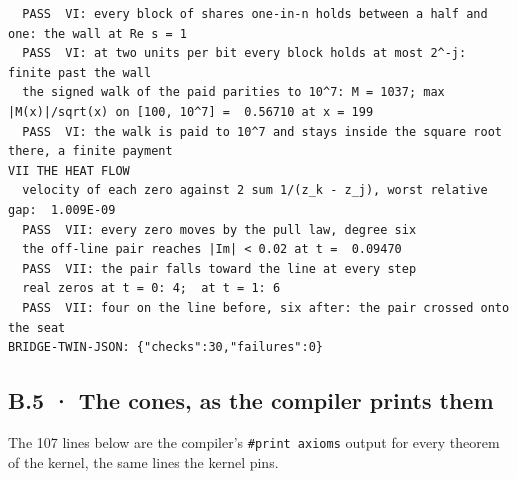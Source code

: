 \documentclass[10pt,twocolumn]{article}
\begin{document}
\begin{Verbatim}
  PASS  VI: every block of shares one-in-n holds between a half and one: the wall at Re s = 1
  PASS  VI: at two units per bit every block holds at most 2^-j: finite past the wall
  the signed walk of the paid parities to 10^7: M = 1037; max |M(x)|/sqrt(x) on [100, 10^7] =  0.56710 at x = 199
  PASS  VI: the walk is paid to 10^7 and stays inside the square root there, a finite payment
VII THE HEAT FLOW
  velocity of each zero against 2 sum 1/(z_k - z_j), worst relative gap:  1.009E-09
  PASS  VII: every zero moves by the pull law, degree six
  the off-line pair reaches |Im| < 0.02 at t =  0.09470
  PASS  VII: the pair falls toward the line at every step
  real zeros at t = 0: 4;  at t = 1: 6
  PASS  VII: four on the line before, six after: the pair crossed onto the seat
BRIDGE-TWIN-JSON: {"checks":30,"failures":0}
\end{Verbatim}

\hypertarget{b.5-the-cones-as-the-compiler-prints-them}{%
\subsection{B.5 · The cones, as the compiler prints
them}\label{b.5-the-cones-as-the-compiler-prints-them}}

The 107 lines below are the compiler's \texttt{\#print\ axioms} output
for every theorem of the kernel, the same lines the kernel pins.
\end{document}
